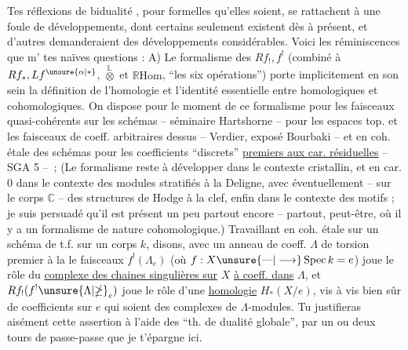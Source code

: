 
 Tes réflexions de bidualité , pour formelles qu'elles soient, se rattachent à une foule de développements, dont certains seulement existent\unsure{,} dès à présent, et d'autres demanderaient des développements considérables. Voici les réminiscences que m' tes naïves questions :
%
A) Le formalisme des $Rf_!, f^!$ (combiné à $Rf_*, Lf^{\unsure{\alpha|*}}$, $\overset{\mathbb{L}}{\otimes}$ et $\mathbb{R}\mathrm{Hom}$, ``les six opérations'') porte implicitement en son sein la définition de l'homologie et l'identité essentielle entre  homologiques et cohomologiques.  On dispose pour le moment de ce formalisme pour les faisceaux quasi-cohérents sur les schémas -- séminaire Hartshorne -- pour les espaces top. et les faisceaux de coeff. arbitraires dessus -- Verdier, exposé Bourbaki -- et en coh. étale des schémas pour les coefficients ``discrets''  \uline{premiers aux  car. résiduelles} -- SGA 5 -- \,; (Le formalisme reste à développer dans le contexte cristallin, et en car. $0$ dans le contexte des modules stratifiés  à la Deligne, avec éventuellement -- sur le corps $\mathbb{C}$ -- des structures de Hodge à la clef, enfin dans le contexte des motifs ; je suis persuadé qu'il est présent un peu partout encore -- partout, peut-être, où il y a un formalisme de nature cohomologique.) Travaillant en coh. étale sur un schéma  de t.f. sur un corps $k$, disons, avec un anneau de coeff. $\Lambda$ de torsion premier à la \unsure{,}
%
le  faisceaux $f^!(\Lambda_e)$ (où $f:X\unsure{\text{---}|\longrightarrow}\operatorname{Spec} k=e$) joue le rôle du \uline{complexe des chaines singulières sur} $X$ \uline{à coeff. dans} $\Lambda$, et $Rf_!(f^!{\unsure{\Lambda|\mathbb{\Lambda}}}_e)$ joue le rôle d'une \uline{homologie} $H_*(X/e)$, vis à vis bien sûr de coefficients sur $e$ qui soient des complexes de $\Lambda$-modules. Tu justifieras aisément cette assertion à l'aide des ``th. de dualité globale'', par un ou deux tours de passe-passe que je t'épargne ici.

